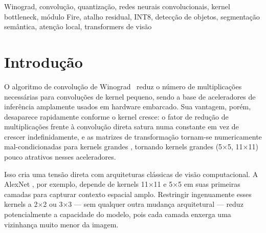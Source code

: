 \documentclass[conference]{IEEEtran}
\begin{document}
\begin{abstract}
tarefas, mas \texttt{AlexNetFire} — quase indistinguível de \texttt{AlexNetBottleneck} em
classificação — cai para menos da metade do mAP (8,94\%). Paridade em classificação não garante
paridade em predição densa. Segundo, avaliamos se atenção local (janelas ao estilo Swin, ViT/DeiT)
reproduz o perfil de acurácia/eficiência/quantização das CNNs de kernel pequeno, em sete modelos.
Janelas menores custam acurácia, como kernels menores, e nenhum dos sete
aciona um \textit{kernel} Winograd em nenhuma configuração — consistente com a ausência de
convoluções 3$\times$3 de \textit{stride} 1 nessas arquiteturas. Cinco dos sete modelos, porém,
\emph{ganham} acurácia sob quantização INT8 (até $+$2,10 p.p.), enquanto os outros dois caem
apenas ligeiramente ($-$0,22 e $-$0,06 p.p.); a destilação DeiT é o mais forte dos sete
(46,38\% FP32), mas à custa de 5--7$\times$ mais parâmetros (2,76M) que as arquiteturas
Pareto-ótimas deste estudo. Os resultados sugerem que compensação
estrutural leve — e não kernels maiores — é uma via eficiente para recuperar acurácia em
arquiteturas compatíveis com Winograd neste protocolo, e que mecanismos de custo zero (um único atalho residual)
podem aproximar-se de arquiteturas híbridas mais elaboradas.
\end{abstract}

\begin{IEEEkeywords}
Winograd, convolução, quantização, redes neurais convolucionais, kernel bottleneck, módulo Fire,
atalho residual, INT8, detecção de objetos, segmentação semântica, atenção local, transformers de
visão
\end{IEEEkeywords}

\section{Introdução}

O algoritmo de convolução de Winograd~\cite{lavin2016fast} reduz o número de multiplicações
necessárias para convoluções de kernel pequeno, sendo a base de aceleradores de inferência
amplamente usados em hardware embarcado. Sua vantagem, porém, desaparece rapidamente conforme o
kernel cresce: o fator de redução de multiplicações frente à convolução direta satura numa
constante em vez de crescer indefinidamente, e as matrizes de transformação tornam-se
numericamente mal-condicionadas para kernels grandes \cite{barabasz2020error}, tornando kernels
grandes (5$\times$5, 11$\times$11) pouco atrativos nesses aceleradores.

Isso cria uma tensão direta com arquiteturas clássicas de visão computacional. A AlexNet
\cite{krizhevsky2012imagenet}, por exemplo, depende de kernels 11$\times$11 e 5$\times$5 em suas
primeiras camadas para capturar contexto espacial amplo. Restringir ingenuamente esses kernels a
2$\times$2 ou 3$\times$3 — sem qualquer outra mudança arquitetural — reduz potencialmente a
capacidade do modelo, pois cada camada enxerga uma vizinhança muito menor da imagem.
\end{document}
